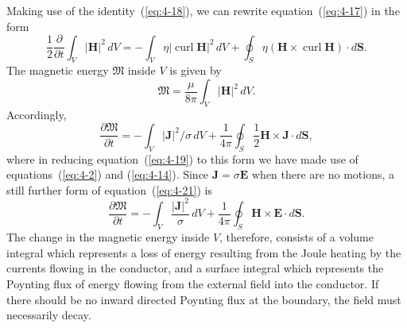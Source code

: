 Making use of the identity~(\ref{eq:4-18}), we can rewrite equation~(\ref{eq:4-17}) in the form
\begin{equation}
\label{eq:4-19}
\frac{1}{2}\frac{\partial}{\partial t}\int_V |\mathbf{H}|^2\,dV = -\int_V \eta|\operatorname{curl}\mathbf{H}|^2\,dV + \oint_S \eta(\mathbf{H}\times\operatorname{curl}\mathbf{H})\cdot d\mathbf{S}.
\end{equation}
The magnetic energy $\mathfrak{M}$ inside $V$ is given by
\begin{equation}
\label{eq:4-20}
\mathfrak{M} = \frac{\mu}{8\pi}\int_V |\mathbf{H}|^2\,dV.
\end{equation}
Accordingly,
\begin{equation}
\label{eq:4-21}
\frac{\partial\mathfrak{M}}{\partial t} = -\int_V |\mathbf{J}|^2/\sigma\,dV + \frac{1}{4\pi}\oint_S \frac{1}{2}\mathbf{H}\times\mathbf{J}\cdot d\mathbf{S},
\end{equation}
where in reducing equation~(\ref{eq:4-19}) to this form we have made use of equations~(\ref{eq:4-2}) and (\ref{eq:4-14}). Since $\mathbf{J}=\sigma\mathbf{E}$ when there are no motions, a still further form of equation~(\ref{eq:4-21}) is
\begin{equation}
\label{eq:4-22}
\frac{\partial\mathfrak{M}}{\partial t} = -\int_V \frac{|\mathbf{J}|^2}{\sigma}\,dV + \frac{1}{4\pi}\oint_S \mathbf{H}\times\mathbf{E}\cdot d\mathbf{S}.
\end{equation}
The change in the magnetic energy inside $V$, therefore, consists of a volume integral which represents a loss of energy resulting from the Joule heating by the currents flowing in the conductor, and a surface integral which represents the Poynting flux of energy flowing from the external field into the conductor. If there should be no inward directed Poynting flux at the boundary, the field must necessarily decay.

